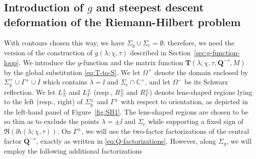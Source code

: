 \subsection{Introduction of $g$ and steepest descent deformation of the Riemann-Hilbert problem}
With contours chosen this way, we have $\Sigma_g \cup \Sigma_\mathrm{c} = \emptyset$; therefore, we need the version of the construction of $g(\lambda;\chi,\tau)$ described in Section~\ref{sec:g-function-loop}. We introduce the $g$-function and the matrix function $\mathbf{T}(\lambda;\chi,\tau,\mathbf{Q}^{-s}, M)$ by the global substitution \eqref{eq:T-to-S}.
We let $\Omega^+$ denote the domain enclosed by $\Sigma_g^+ \cup \Gamma^+ \cup I $ which contains $\lambda=\ii$ and $\Sigma_\mathrm{c} \cap \mathbb{C}^+$, and let $\Omega^{-}$ be its Schwarz reflection. 
We let $L_\Sigma^\pm$ and $L_\Gamma^\pm$ (resp., $R_\Sigma^\pm$ and $R_\Gamma^\pm$) denote lens-shaped regions lying to the left (resp., right) of $\Sigma_g^\pm$ and $\Gamma^\pm$ with respect to orientation, as depicted in the left-hand panel of Figure~\ref{fig:SB1}. 
The lens-shaped regions are chosen to be so thin as to exclude the points $\lambda=\pm \ii$ and $\Sigma_\mathrm{c}$ while supporting a fixed sign of $\Re(\ii h(\lambda;\chi,\tau))$. 
On $\Gamma^\pm$, we will use the two-factor factorizations of the central factor $\mathbf{Q}^{-s}$, exactly as written in \eqref{eq:Q-factorizations}.
However, along $\Sigma_g$, we will employ the following additional factorizations
